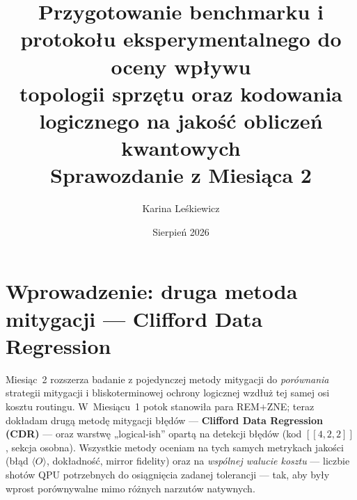 \documentclass[11pt,a4paper]{article}
\title{%
    Przygotowanie benchmarku i protokołu eksperymentalnego do oceny wpływu\\
    topologii sprzętu oraz kodowania logicznego na jakość obliczeń kwantowych\\
    \large Sprawozdanie z Miesiąca 2
}
\author{Karina Leśkiewicz}
\date{Sierpień 2026}
\begin{document}
\maketitle
\thispagestyle{empty}

\begin{center}
\end{center}

\section{Wprowadzenie: druga metoda mitygacji --- Clifford Data Regression}
\label{sec:cdr-intro}

Miesiąc~2 rozszerza badanie z pojedynczej metody mitygacji do \emph{porównania} strategii
mitygacji i bliskoterminowej ochrony logicznej wzdłuż tej samej osi kosztu routingu. W~Miesiącu~1
potok stanowiła para REM${+}$ZNE; teraz dokładam drugą metodę mitygacji błędów ---
\textbf{Clifford Data Regression (CDR)} --- oraz warstwę „logical-ish'' opartą na detekcji błędów
(kod $[[4,2,2]]$, sekcja osobna). Wszystkie metody oceniam na tych samych metrykach jakości
(błąd $\langle O\rangle$, dokładność, mirror fidelity) oraz na \emph{wspólnej walucie kosztu} ---
liczbie shotów QPU potrzebnych do osiągnięcia zadanej tolerancji --- tak, aby były wprost
porównywalne mimo różnych narzutów natywnych.
\end{document}
